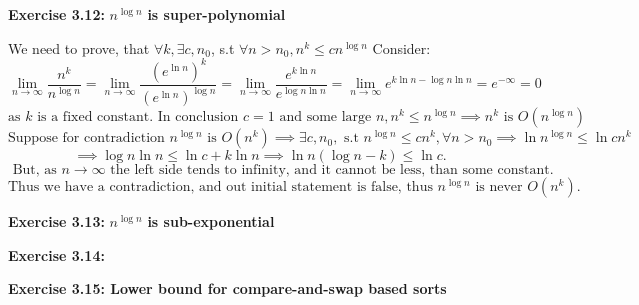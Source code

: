 \documentclass{article}
\begin{document}
\begin{framed}
    \noindent \textbf{Exercise 3.12: } $n^{\log{n}}$ \textbf{ is super-polynomial}
    
    \medskip
    We need to prove, that $\forall k, \exists c, n_0$, s.t $\forall n > n_0, n^{k} \leq cn^{\log{n}}$ Consider:
    $$
    \lim_{n \rightarrow \infty}{\frac{n^k}{n^{\log{n}}}} = \lim_{n \rightarrow \infty}{\frac{(e^{\ln{n}})^{k}}{(e^{\ln{n}})^{\log{n}}}} = \lim_{n \rightarrow \infty}{\frac{e^{k\ln{n}}}{e^{\log{n}\ln{n}}}} = \lim_{n \rightarrow \infty}{e^{k\ln{n} - \log{n}\ln{n}} = e^{-\infty} = 0}
    $$
    $$
    \text{as } k \text{ is a fixed constant.} \text{ In conclusion } c = 1 \text{ and some large } n, n^{k} \leq n^{\log{n}} \implies n^{k} \text{ is } O(n^{\log{n}})
    $$
    $$
    \text{Suppose for contradiction  } n^{\log{n}} \text{ is } O(n^k) \implies \exists c, n_0, \text{ s.t } n^{\log{n}} \leq cn^{k}, \forall n > n_0 \implies \ln{n^{\log{n}}} \leq \ln{cn^{k}}
    $$
    $$
    \implies \log{n} \ln{n} \leq \ln{c} + k \ln{n} \implies \ln{n}(\log{n} - k) \leq \ln{c}.
    $$
    $$
    \text{ But, as } n \rightarrow \infty 
    \text{ the left side tends to infinity, and it cannot be less, than some constant.}
    $$
    $$\text{Thus we have a contradiction, and out initial statement is false, thus } n^{\log{n}} \text{ is never } O(n^k).
    $$

    
\end{framed}

\bigskip

\begin{framed}
    \noindent \textbf{Exercise 3.13: } $n^{\log{n}}$ \textbf{ is sub-exponential}
    
    \medskip
    
    
\end{framed}

\bigskip

\begin{framed}
    \noindent \textbf{Exercise 3.14: }
    
    \medskip
    
    
\end{framed}

\bigskip

\begin{framed}
    \noindent \textbf{Exercise 3.15: Lower bound for compare-and-swap based sorts}
    
    \medskip
    
    
\end{framed}
\end{document}
